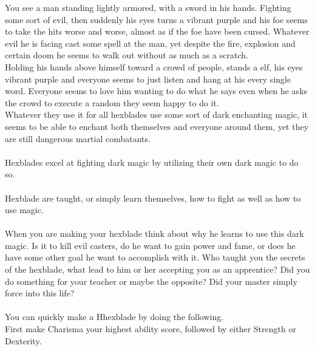 \documentclass[a4paper]{article}
\begin{document}
\begin{multicols}{2}
You see a man standing lightly armored, with a sword in his hands. Fighting some sort of evil, then suddenly his eyes turns a vibrant purple and his foe seems to take the hits worse and worse, almost as if the foe have been cursed. Whatever evil he is facing cast some spell at the man, yet despite the fire, explosion and certain doom he seems to walk out without as much as a scratch.\\
\indent Holding his hands above himself toward a crowd of people, stands a elf, his eyes vibrant purple and everyone seems to just listen and hang at his every single word. Everyone seems to love him wanting to do what he says even when he asks the crowd to execute a random they seem happy to do it.\\
Whatever they use it for all hexblades use some sort of dark enchanting magic, it seems to be able to enchant both themselves and everyone around them, yet they are still dangerous martial combatants.\\
\\
Hexblades excel at fighting dark magic by utilizing their own dark magic to do so.\\
\\
Hexblade are taught, or simply learn themselves, how to fight as well as how to use magic.\\
\\
When you are making your hexblade think about why he learns to use this dark magic. Is it to kill evil casters, do he want to gain power and fame, or does he have some other goal he want to accomplish with it. Who taught you the secrets of the hexblade, what lead to him or her accepting you as an apprentice? Did you do something for your teacher or maybe the opposite? Did your master simply force into this life?\\
\\
You can quickly make a Hhexblade by doing the following.\\
First make Charisma your highest ability score, followed by either Strength or Dexterity.\\

\end{multicols}
\end{document}
